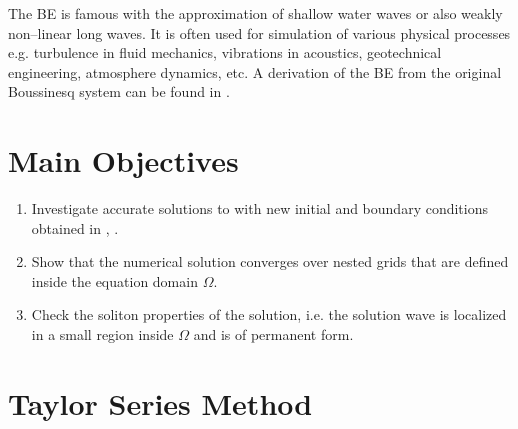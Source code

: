 \documentclass[a0,portrait]{a0poster}
\begin{document}
\begin{multicols}{2}
The BE is famous with the approximation of shallow water waves or also weakly non--linear long waves. It is often used for simulation of various physical processes e.g. turbulence in fluid mechanics, vibrations in acoustics, geotechnical engineering, atmosphere dynamics, etc. A derivation of the BE from the original Boussinesq system can be found in \cite{ChChr}.

\color{DarkSlateGray} %

\section*{Main Objectives}

\begin{enumerate}
\item Investigate accurate solutions to  with new initial and boundary conditions obtained in \cite{EllipticProblem}, \cite{BoundaryProblem}.
\item Show that the numerical solution converges over nested grids that are defined inside the equation domain $\Omega$.
\item Check the soliton properties of the solution, i.e. the solution wave is localized in a small region inside $\Omega$ and is of permanent form. 
\end{enumerate}


\section*{Taylor Series Method}


\end{multicols}
\end{document}
